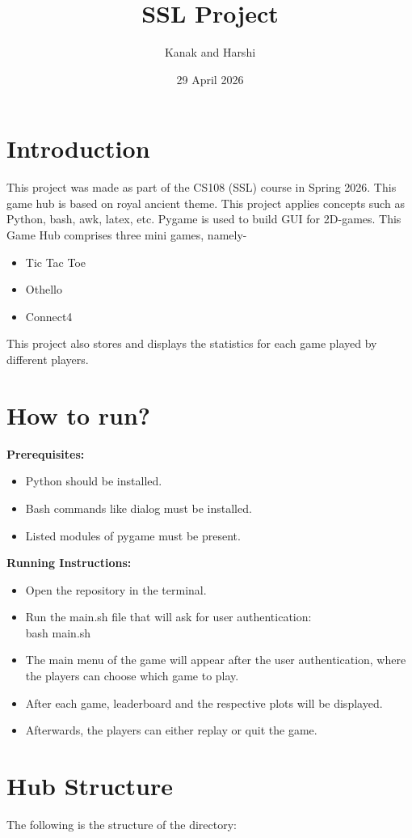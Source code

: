 \documentclass{article}
\title{SSL Project}
\author{Kanak and Harshi}
\date{29 April 2026}
\begin{document}
\maketitle
\tableofcontents
\newpage
\section{Introduction}
This project was made as part of the CS108 (SSL) course in Spring 2026. This game hub is based on royal ancient theme. 
This project applies concepts such as Python, bash, awk, latex, etc. Pygame is used to build GUI for 2D-games.
This Game Hub comprises three mini games, namely-
\begin{itemize}
    \item Tic Tac Toe
    \item Othello
    \item Connect4
\end{itemize}
This project also stores and displays the statistics for each game played by different players.

\section{How to run?}
\textbf{Prerequisites:}
\begin{itemize}
    \item Python should be installed.
    \item Bash commands like dialog must be installed.
    \item Listed modules of pygame must be present.
\end{itemize}
\textbf{Running Instructions:}
\begin{itemize}
    \item Open the repository in the terminal.
    \item Run the main.sh file that will ask for user authentication:\\
    bash main.sh
    \item The main menu of the game will appear after the user authentication, where the players can choose which game to play.
    \item After each game, leaderboard and the respective plots will be displayed.
    \item Afterwards, the players can either replay or quit the game.
\end{itemize}

\section{Hub Structure}
The following is the structure of the directory:
\end{document}
